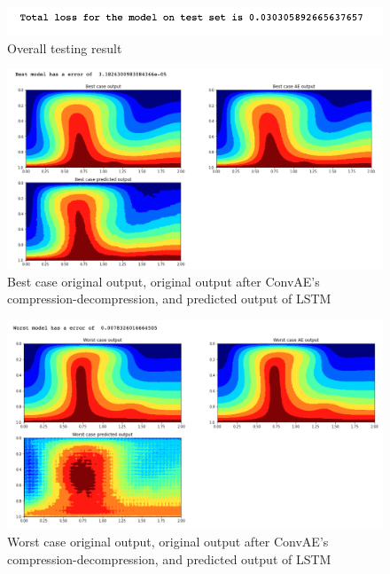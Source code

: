 \begin{figure}[H]
    \caption{Overall testing result}
    \includegraphics[scale=0.8]{figures/mantle_convection_images/larger_dataset/LSTM_OverallTesting.png}
\end{figure}

\begin{figure}[H]
    \caption{Best case original output, original output after ConvAE's compression-decompression, and predicted output of LSTM}
    \includegraphics[scale=0.5]{figures/mantle_convection_images/larger_dataset/LSTM_Best.png}
\end{figure}

\begin{figure}[H]
    \caption{Worst case original output, original output after ConvAE's compression-decompression, and predicted output of LSTM}
    \includegraphics[scale=0.5]{figures/mantle_convection_images/larger_dataset/LSTM_Worst.png}
\end{figure}


